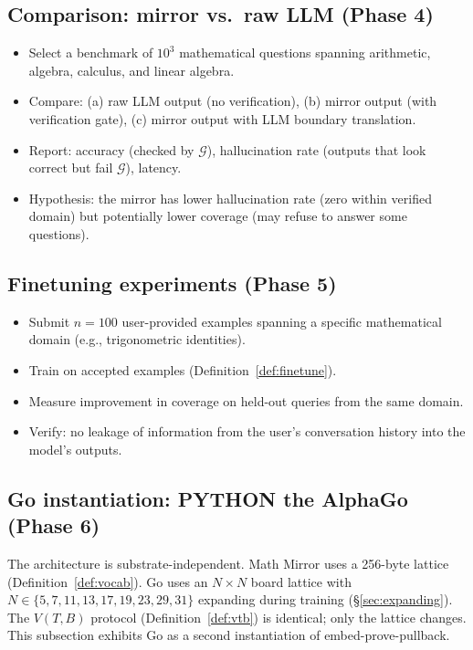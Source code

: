 \documentclass[11pt,a4paper]{article}
\newcommand{\cG}{\mathcal{G}}
\begin{document}
\subsection{Comparison: mirror vs.\ raw LLM (Phase 4)}

\begin{itemize}[nosep]
\item Select a benchmark of $10^3$ mathematical questions
  spanning arithmetic, algebra, calculus, and linear algebra.
\item Compare: (a) raw LLM output (no verification),
  (b) mirror output (with verification gate),
  (c) mirror output with LLM boundary translation.
\item Report: accuracy (checked by $\cG$), hallucination rate
  (outputs that look correct but fail $\cG$), latency.
\item Hypothesis: the mirror has lower hallucination rate
  (zero within verified domain) but potentially lower coverage
  (may refuse to answer some questions).
\end{itemize}

\subsection{Finetuning experiments (Phase 5)}

\begin{itemize}[nosep]
\item Submit $n = 100$ user-provided examples spanning a
  specific mathematical domain (e.g., trigonometric identities).
\item Train on accepted examples (Definition~\ref{def:finetune}).
\item Measure improvement in coverage on held-out queries
  from the same domain.
\item Verify: no leakage of information from the user's
  conversation history into the model's outputs.
\end{itemize}

\subsection{Go instantiation: PYTHON the AlphaGo (Phase 6)}\label{sec:go}

The architecture is substrate-independent.
Math Mirror uses a 256-byte lattice (Definition~\ref{def:vocab}).
Go uses an $N \times N$ board lattice with
$N \in \{5, 7, 11, 13, 17, 19, 23, 29, 31\}$ expanding during training
(\S\ref{sec:expanding}).
The $V(T,B)$ protocol (Definition~\ref{def:vtb}) is identical;
only the lattice changes.
This subsection exhibits Go as a second instantiation of
embed-prove-pullback.
\end{document}
